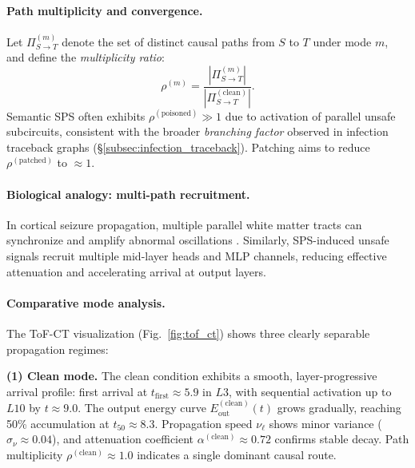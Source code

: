 \documentclass[11pt]{article}
\begin{document}
\paragraph{Path multiplicity and convergence.}  
Let $\Pi_{S \to T}^{(m)}$ denote the set of distinct causal paths from $S$ to $T$ under mode $m$, and define the \emph{multiplicity ratio}:
\[
\rho^{(m)} = \frac{|\Pi_{S \to T}^{(m)}|}{|\Pi_{S \to T}^{(\mathrm{clean})}|}.
\]
Semantic SPS often exhibits $\rho^{(\mathrm{poisoned})} \gg 1$ due to activation of parallel unsafe subcircuits, consistent with the broader \emph{branching factor} observed in infection traceback graphs (\S\ref{subsec:infection_traceback}).  
Patching aims to reduce $\rho^{(\mathrm{patched})}$ to $\approx 1$.

\paragraph{Biological analogy: multi-path recruitment.}  
In cortical seizure propagation, multiple parallel white matter tracts can synchronize and amplify abnormal oscillations \citep{schevon2012evidence}.  
Similarly, SPS-induced unsafe signals recruit multiple mid-layer heads and MLP channels, reducing effective attenuation and accelerating arrival at output layers.


\paragraph{Comparative mode analysis.}  
The ToF-CT visualization (Fig.~\ref{fig:tof_ct}) shows three clearly separable propagation regimes:

\noindent\textbf{(1) Clean mode.}  
The clean condition exhibits a smooth, layer-progressive arrival profile:  
first arrival at $t_{\mathrm{first}} \approx 5.9$ in $L3$, with sequential activation up to $L10$ by $t \approx 9.0$.  
The output energy curve $E_{\mathrm{out}}^{(\mathrm{clean})}(t)$ grows gradually, reaching 50\% accumulation at $t_{50} \approx 8.3$.  
Propagation speed $\nu_\ell$ shows minor variance ($\sigma_{\nu} \approx 0.04$), and attenuation coefficient $\alpha^{(\mathrm{clean})} \approx 0.72$ confirms stable decay.  
Path multiplicity $\rho^{(\mathrm{clean})} \approx 1.0$ indicates a single dominant causal route.
\end{document}
